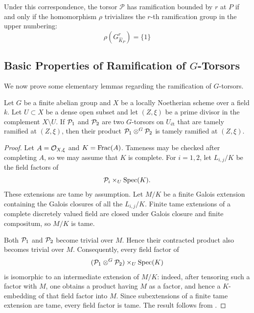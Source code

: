 Under this correspondence, the torsor $\mathcal{P}$ has ramification bounded by $r$ at $P$
if and only if the homomorphism $\rho$ trivializes the $r$-th ramification group in the upper numbering:
\[ \rho(G_{\widehat{K}_P}^r) = \{ 1 \} \]

\subsection*{Basic Properties of Ramification of \texorpdfstring{$G$-Torsors}{G-Torsors}}
We now prove some elementary lemmas regarding the ramification of $G$-torsors.
\begin{lemma}\label{lemma:bounding_ramification_of_contracted_product}
    Let $G$ be a finite abelian group and $X$ be a locally Noetherian scheme over a field $k$.
    Let $U \subset X$ be a dense open subset and let $(Z, \xi)$ be a prime divisor in the complement $X \setminus U$.
    If $\mathcal{P}_1$ and $\mathcal{P}_2$ are two $G$-torsors on $U_{\text{ét}}$ that are tamely ramified at $(Z, \xi)$, then their product
    $\mathcal{P}_1 \otimes^G \mathcal{P}_2$ is tamely ramified at $(Z, \xi)$.
\end{lemma}
\begin{proof}
    Let $A=\mathcal{O}_{X,\xi}$ and $K=\operatorname{Frac}(A)$. Tameness may be checked after
    completing $A$, so we may assume that $K$ is complete. For $i=1,2$, let
    $L_{i,j}/K$ be the field factors of
    \[
        \mathcal{P}_i\times_U\operatorname{Spec}(K).
    \]
    These extensions are tame by assumption. Let $M/K$ be a finite Galois
    extension containing the Galois closures of all the $L_{i,j}/K$. Finite
    tame extensions of a complete discretely valued field are closed under
    Galois closure and finite compositum, so $M/K$ is tame.

    Both $\mathcal{P}_1$ and $\mathcal{P}_2$ become trivial over $M$. Hence their contracted
    product also becomes trivial over $M$. Consequently, every field factor of
    \[
        (\mathcal{P}_1\otimes^G\mathcal{P}_2)\times_U\operatorname{Spec}(K)
    \]
    is isomorphic to an intermediate extension of $M/K$: indeed, after tensoring
    such a factor with $M$, one obtains a product having $M$ as a factor, and
    hence a $K$-embedding of that field factor into $M$. Since subextensions of
    a finite tame extension are tame, every field factor is tame. The result
    follows from .
\end{proof}

